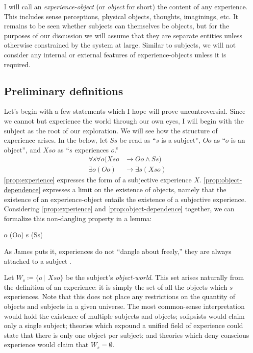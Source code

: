 \documentclass[leqno]{article}
\newcounter{lemma}
\begin{document}
	I will call an \emph{experience-object} (or \emph{object} for short) the content
	of any experience. This includes sense perceptions, physical objects, thoughts,
	imaginings, etc. It remains to be seen whether subjects can themselves be objects,
	but for the purposes of our discussion we will assume that they are separate
	entities unless otherwise constrained by the system at large. Similar to subjects,
	we will not consider any internal or external features of experience-objects
	unless it is required.

	\subsection{Preliminary definitions}

	Let's begin with a few statements which I hope will prove uncontroversial.
	Since we cannot but experience the world through our own eyes, I will begin with
	the subject as the root of our exploration. We will see how the structure of
	experience arises. In the below, let $Ss$ be read as \enquote{$s$ is a subject},
	$Oo$ as \enquote{$o$ is an object}, and $Xso$ as \enquote{$s$ experiences $o$.}%
	\begin{align}
		\label{prop:experience}\forall s \forall o (Xso & \rightarrow Oo \land Ss)    \\
		\label{prop:object-dependence}\exists o (Oo)    & \rightarrow \exists s (Xso)
	\end{align}%
	\eqref{prop:experience} expresses the form of a subjective experience $X$. \eqref{prop:object-dependence}
	expresses a limit on the existence of objects, namely that the existence of an
	experience-object entails the existence of a subjective experience.
	Considering \eqref{prop:experience} and \eqref{prop:object-dependence}
	together, we can formalize this non-dangling property in a lemma:%
	\begin{lemmalist}
		\label{lemma:object-dependence} \exists o (Oo) \rightarrow \exists s (Ss)
	\end{lemmalist}%
	As James puts it, experiences do not \enquote{dangle about freely,} they are
	always attached to a subject .

	Let $W_{s}\coloneq \{ o \mid Xso \}$ be the subject's \emph{object-world}.
	This set arises naturally from the definition of an experience: it is simply the
	set of all the objects which $s$ experiences. Note that this does not place
	any restrictions on the quantity of objects and subjects in a given universe. The
	most common-sense interpretation would hold the existence of multiple subjects
	and objects; solipsists would claim only a single subject; theories which expound
	a unified field of experience could state that there is only one object per subject;
	and theories which deny conscious experience would claim that
	$W_{s}= \emptyset$.
\end{document}
